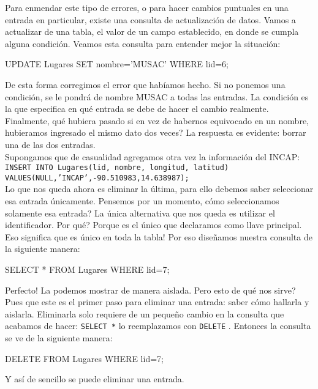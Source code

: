\documentclass[10pt,letterpaper]{article}
\newcommand{\inlinecode}[1]{
\colorbox{light-gray}{\texttt{#1}}
}
\newenvironment{Code}
{
\begin{lrbox}{\selvestebox}%
\begin{minipage}{\dimexpr\columnwidth-2\fboxsep\relax}
\fontfamily{\ttdefault}\selectfont
}
{\end{minipage}\end{lrbox}%
\begin{center}
\colorbox{light-gray}{\usebox{\selvestebox}}
\end{center}
}
\begin{document}
Para enmendar este tipo de errores, o para hacer cambios puntuales en una entrada en particular, existe una consulta de actualizaci\'on de datos. Vamos a actualizar de una tabla, el valor de un campo establecido, en donde se cumpla alguna condici\'on. Veamos esta consulta para entender mejor la situaci\'on:

\begin{Code}
UPDATE Lugares SET nombre='MUSAC' WHERE lid=6;
\end{Code}

De esta forma corregimos el error que hab\'iamos hecho. Si no ponemos una condici\'on, se le pondr\'a de nombre MUSAC a todas las entradas. La condici\'on es la que especifica en qu\'e entrada se debe de hacer el cambio realmente. Finalmente, qu\'e hubiera pasado si en vez de habernos equivocado en un nombre, hubieramos ingresado el mismo dato dos veces? La respuesta es evidente: borrar una de las dos entradas.\\

Supongamos que de casualidad agregamos otra vez la informaci\'on del INCAP:\\ \inlinecode{INSERT INTO Lugares(lid, nombre, longitud, latitud) VALUES(NULL,'INCAP',-90.510983,14.638987);}\\
Lo que nos queda ahora es eliminar la \'ultima, para ello debemos saber seleccionar esa entrada \'unicamente. Pensemos por un momento, c\'omo seleccionamos solamente esa entrada? La \'unica alternativa que nos queda es utilizar el identificador. Por qu\'e? Porque es el \'unico que declaramos como llave principal. Eso significa que es \'unico en toda la tabla! Por eso dise\~namos nuestra consulta de la siguiente manera:

\begin{Code}
SELECT * FROM Lugares WHERE lid=7;
\end{Code}

Perfecto! La podemos mostrar de manera aislada. Pero esto de qu\'e nos sirve? Pues que este es el primer paso para eliminar una entrada: saber c\'omo hallarla y aislarla. Eliminarla solo requiere de un peque\~no cambio en la consulta que acabamos de hacer: \inlinecode{SELECT *} lo reemplazamos con \inlinecode{DELETE}. Entonces la consulta se ve de la siguiente manera:

\begin{Code}
DELETE FROM Lugares WHERE lid=7;
\end{Code}

\noindent Y as\'i de sencillo se puede eliminar una entrada.
\end{document}

